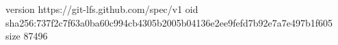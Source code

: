 version https://git-lfs.github.com/spec/v1
oid sha256:737f2c7f63a0ba60c994cb4305b2005b04136e2ee9fefd7b92e7a7e497b1f605
size 87496
